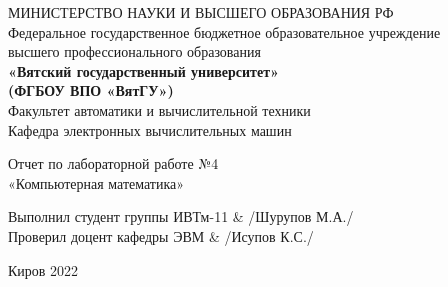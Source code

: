 \thispagestyle{empty}
\begin{center}
    МИНИСТЕРСТВО НАУКИ И ВЫСШЕГО ОБРАЗОВАНИЯ РФ\\
    Федеральное государственное бюджетное образовательное учреждение\\
    высшего профессионального образования\\
    {\bf«Вятский государственный университет»}\\
    {\bf(ФГБОУ ВПО «ВятГУ»)}\\
    Факультет автоматики и вычислительной техники\\
    Кафедра электронных вычислительных машин
\end{center}
\vfill %
\begin{center}
    Отчет по лабораторной работе №4\\
    «Компьютерная математика»
\end{center}

\vfill
\begin{flushleft}
    Выполнил студент группы ИВТм-11 & \hrulefill /Шурупов М.А./\\
    Проверил доцент кафедры ЭВМ & \hrulefill  /Исупов К.С./
\end{flushleft}
\vfill %

\begin{center}
    Киров 2022
\end{center}
\newpage